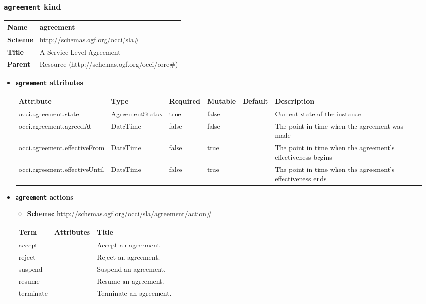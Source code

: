 \subsubsection{\texttt{agreement} kind}
\begin{center}
\begin{tabular}{|l|l|}
  \hline
  \textbf{Name} & agreement \\
  \hline  
  \textbf{Scheme} & http://schemas.ogf.org/occi/sla\# \\
  \hline
  \textbf{Title} & A Service Level Agreement \\
  \hline
  \textbf{Parent} & Resource (http://schemas.ogf.org/occi/core\#) \\
  \hline
\end{tabular}
\end{center}
\begin{itemize}
\item \textbf{\texttt{agreement} attributes}

\begin{tabularx}{\textwidth}{|l|l|p{1.4cm}|p{1.3cm}|l|X|}
  \hline
  \textbf{Attribute} & \textbf{Type} & \textbf{Required} & \textbf{Mutable} & \textbf{Default} & \textbf{Description} \\
  \hline  
  occi.agreement.state & AgreementStatus & true & false &  & Current state of the instance \\
  \hline
  occi.agreement.agreedAt & DateTime & false & false &  & The point in time when the agreement was made \\
  \hline
  occi.agreement.effectiveFrom & DateTime & false & true &  & The point in time when the agreement’s effectiveness begins \\
  \hline
  occi.agreement.effectiveUntil & DateTime & false & true &  & The point in time when the agreement’s effectiveness ends \\
  \hline
\end{tabularx}
\end{itemize}

\begin{itemize}
\item \textbf{\texttt{agreement} actions}

\begin{itemize}
	\item \textbf{Scheme}: http://schemas.ogf.org/occi/sla/agreement/action\#
\end{itemize}
\begin{tabularx}{\textwidth}{|l|l|X|}
  \hline
  \textbf{Term}  & \textbf{Attributes} & \textbf{Title} \\
  \hline  
  accept & & Accept an agreement. \\
  \hline
  reject & & Reject an agreement. \\
  \hline
  suspend & & Suspend an agreement. \\
  \hline
  resume & & Resume an agreement. \\
  \hline
  terminate & & Terminate an agreement. \\
  \hline
\end{tabularx}
\end{itemize}

